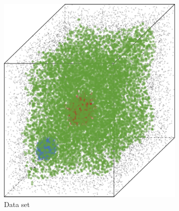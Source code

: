 		\begin{figure}
			\centering
			\begin{subfigure}{0.23\textwidth}
				\centering
				\includegraphics[keepaspectratio=true, width=\textwidth, height=0.23\textheight]{discussion/img/ferdosi_2_abs_error_mbeSmallerThansambe}
				\caption{Data set \ferdosiTwo}
				\label{fig:discussion:performance:mbeLowerError:ferdosi2}
			\end{subfigure}
			\begin{subfigure}{0.23\textwidth}
				\centering

\end{subfigure}
\end{figure}
